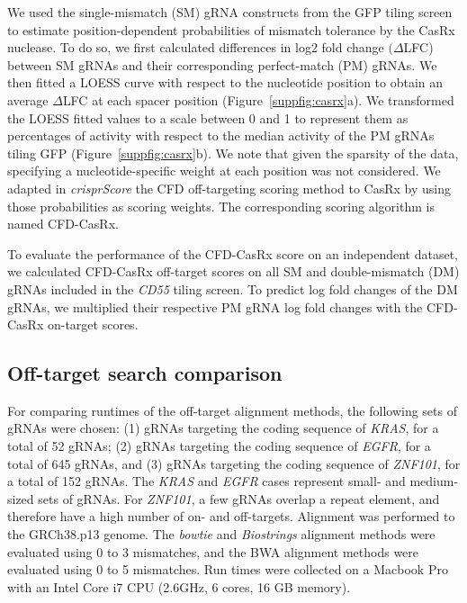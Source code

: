 \documentclass[pdftex,english,10pt]{article}
\begin{document}
{We used the single-mismatch (SM) gRNA constructs from the GFP tiling screen to estimate position-dependent probabilities of mismatch tolerance by the CasRx nuclease. To do so, we first calculated differences in log2 fold change $(\Delta$LFC) between SM gRNAs and their corresponding perfect-match (PM) gRNAs. We then fitted a LOESS curve with respect to the nucleotide position to obtain an average $\Delta$LFC at each spacer position (Figure~\ref{suppfig:casrx}a). We transformed the LOESS fitted values to a scale between 0 and 1 to represent them as percentages of activity with respect to the median activity of the PM gRNAs tiling GFP (Figure~\ref{suppfig:casrx}b). We note that given the sparsity of the data, specifying a nucleotide-specific weight at each position was not considered. We adapted in \textit{crisprScore} the CFD off-targeting scoring method to CasRx by using those probabilities as scoring weights. The corresponding scoring algorithm is named CFD-CasRx. 

To evaluate the performance of the CFD-CasRx score on an independent dataset, we calculated CFD-CasRx off-target scores on all SM and double-mismatch (DM) gRNAs included in the \textit{CD55} tiling screen. To predict log fold changes of the DM gRNAs, we multiplied their respective PM gRNA log fold changes with the CFD-CasRx on-target scores. 


\subsection*{Off-target search comparison}

For comparing runtimes of the off-target alignment methods, the following sets of gRNAs were chosen:  (1) gRNAs targeting the coding sequence of \textit{KRAS}, for a total of 52 gRNAs; (2) gRNAs targeting the coding sequence of \textit{EGFR}, for a total of 645 gRNAs, and (3) gRNAs targeting the coding sequence of \textit{ZNF101}, for a total of 152 gRNAs. The \textit{KRAS} and \textit{EGFR} cases represent small- and medium-sized sets of gRNAs. For \textit{ZNF101}, a few gRNAs overlap a repeat element, and therefore have a high number of on- and off-targets. Alignment was performed to the GRCh38.p13 genome. The \textit{bowtie} and \textit{Biostrings} alignment methods were evaluated using 0 to 3 mismatches, and the BWA alignment methods were evaluated using 0 to 5 mismatches. Run times were collected on a Macbook Pro with an Intel Core i7 CPU (2.6GHz, 6 cores, 16 GB memory).





}
\end{document}
